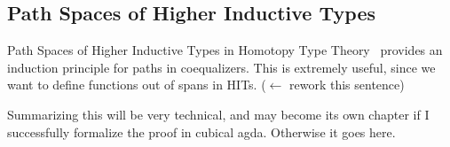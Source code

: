 \subsection{Path Spaces of Higher Inductive Types}
Path Spaces of Higher Inductive Types in Homotopy Type
Theory~\cite{kraus2019path} provides an induction principle for paths in
coequalizers. This is extremely useful, since we want to define functions out of
spans in HITs. ($\leftarrow$ rework this sentence)

Summarizing this will be very technical, and may become its own chapter if I
successfully formalize the proof in cubical agda. Otherwise it goes here.